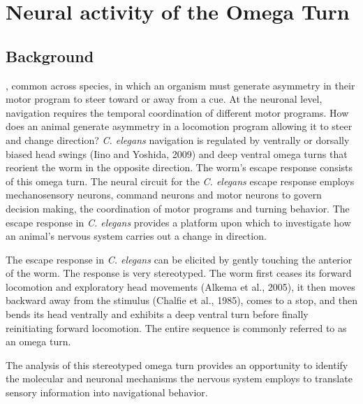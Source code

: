 
\begin{comment}
	Points to make here:
	Navigatoin is worthy of study
	Omega turn is a critical part of navigation
	
\end{comment}

\chapter{Neural activity of the Omega Turn}

\section{Background}

, common across species, in which an organism must generate asymmetry in their motor program to steer toward or away from a cue.  At the neuronal level, navigation requires the temporal coordination of different motor programs.  How does an animal generate asymmetry in a locomotion program allowing it to steer and change direction?  \textit{C. elegans} navigation is regulated by ventrally or dorsally biased head swings (Iino and Yoshida, 2009) and deep ventral omega turns that reorient the worm in the opposite direction.  The worm's escape response consists of this omega turn. The neural circuit for the \textit{C. elegans} escape response employs mechanosensory neurons, command neurons and motor neurons to govern decision making, the coordination of motor programs and turning behavior. The escape response in \textit{C. elegans} provides a platform upon which to investigate how an animal's nervous system carries out a change in direction.  




The escape response in \textit{C. elegans} can be elicited by gently touching the anterior of the worm. The response is very stereotyped. The worm first ceases its forward locomotion and exploratory head movements (Alkema et al., 2005), it then moves backward away from the stimulus (Chalfie et al., 1985), comes to a stop, and then bends its head ventrally and  exhibits a deep ventral turn before finally reinitiating forward locomotion.  The entire sequence is commonly referred to as an omega turn. 

The analysis of this stereotyped omega turn provides an opportunity to identify the molecular and neuronal mechanisms  the nervous system employs to translate sensory information into navigational behavior.  


